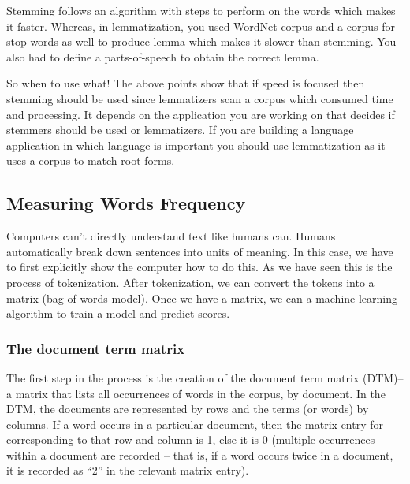 \documentclass[11pt]{article}
\begin{document}
Stemming follows an algorithm with steps to perform on the words which
makes it faster. Whereas, in lemmatization, you used WordNet corpus and
a corpus for stop words as well to produce lemma which makes it slower
than stemming. You also had to define a parts-of-speech to obtain the
correct lemma.

So when to use what! The above points show that if speed is focused then
stemming should be used since lemmatizers scan a corpus which consumed
time and processing. It depends on the application you are working on
that decides if stemmers should be used or lemmatizers. If you are
building a language application in which language is important you
should use lemmatization as it uses a corpus to match root forms.

    \hypertarget{measuring-words-frequency}{%
\subsection{Measuring Words Frequency}\label{measuring-words-frequency}}

    Computers can't directly understand text like humans can. Humans
automatically break down sentences into units of meaning. In this case,
we have to first explicitly show the computer how to do this. As we have
seen this is the process of tokenization. After tokenization, we can
convert the tokens into a matrix (bag of words model). Once we have a
matrix, we can a machine learning algorithm to train a model and predict
scores.

    \hypertarget{the-document-term-matrix}{%
\subsubsection{The document term
matrix}\label{the-document-term-matrix}}

    The first step in the process is the creation of the document term
matrix (DTM)-- a matrix that lists all occurrences of words in the
corpus, by document. In the DTM, the documents are represented by rows
and the terms (or words) by columns. If a word occurs in a particular
document, then the matrix entry for corresponding to that row and column
is 1, else it is 0 (multiple occurrences within a document are recorded
-- that is, if a word occurs twice in a document, it is recorded as
``2'' in the relevant matrix entry).
\end{document}

